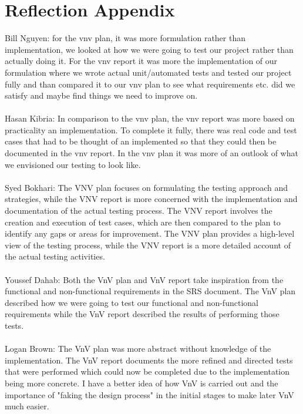 \documentclass[12pt, titlepage]{article}
\begin{document}
\section{Reflection Appendix}
Bill Nguyen: for the vnv plan, it was more formulation rather than implementation, we looked at how we were going to test our project rather than actually doing it. For the vnv report it was more the implementation of our formulation where we wrote actual unit/automated tests and tested our project fully and than compared it to our vnv plan to see what requirements etc. did we satisfy and maybe find things we need to improve on.\\\\
Hasan Kibria: In comparison to the vnv plan, the vnv report was more based on practicality an implementation. To complete it fully, there was real code and test cases that had to be thought of an implemented so that they could then be documented in the vnv report. In the vnv plan it was more of an outlook of what we envisioned our testing to look like.\\\\
Syed Bokhari: The VNV plan focuses on formulating the testing approach and strategies, while the VNV report is more concerned with the implementation and documentation of the actual testing process. The VNV report involves the creation and execution of test cases, which are then compared to the plan to identify any gaps or areas for improvement. The VNV plan provides a high-level view of the testing process, while the VNV report is a more detailed account of the actual testing activities.\\\\
Youssef Dahab: Both the VnV plan and VnV report take inspiration from the functional and non-functional requirements in the SRS document. The VnV plan described how we were going to test our functional and non-functional requirements while the VnV report described the results of performing those tests.\\\\
Logan Brown: The VnV plan was more abstract without knowledge of the implementation. The VnV report documents the more refined and directed tests that were performed which could now be completed due to the implementation being more concrete. I have a better idea of how VnV is carried out and the importance of "faking the design process" in the initial stages to make later VnV much easier.\\\\




\end{document}
